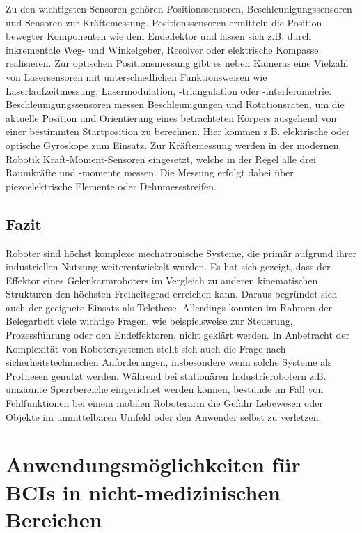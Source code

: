 \documentclass[11pt,ngerman,parskip=half]{scrartcl}
\begin{document}
Zu den wichtigsten Sensoren gehören Positionssensoren,
Beschleunigungssensoren und Sensoren zur Kräftemessung. Positionssensoren
ermitteln die Position bewegter Komponenten wie dem Endeffektor und lassen sich
z.B. durch inkrementale Weg- und Winkelgeber, Resolver oder elektrische Kompasse
realisieren. Zur optischen Positionsmessung gibt es neben Kameras eine Vielzahl 
von Lasersensoren mit unterschiedlichen Funktionsweisen wie
Laserlaufzeitmessung, Lasermodulation, -triangulation oder -interferometrie.
Beschleunigungssensoren messen Beschleunigungen und Rotationsraten, um die
aktuelle Position und Orientierung eines betrachteten Körpers ausgehend von
einer bestimmten Startposition zu berechnen. Hier kommen z.B. elektrische
oder optische Gyroskope zum Einsatz. Zur Kräftemessung werden in der modernen
Robotik Kraft-Moment-Sensoren eingesetzt, welche in der Regel alle drei
Raumkräfte und -momente messen. Die Messung erfolgt dabei über
piezoelektrische Elemente oder Dehnmessstreifen.
\parencite[vgl.][98--117]{hesse_taschenbuch_2016}

\subsection{Fazit}
\label{subsec:john_fazit}
Roboter sind höchst komplexe mechatronische Systeme, die primär aufgrund
ihrer industriellen Nutzung weiterentwickelt wurden. Es hat sich gezeigt,
dass der Effektor eines Gelenkarmroboters im Vergleich zu anderen
kinematischen Strukturen den höchsten Freiheitsgrad erreichen kann. Daraus
begründet sich auch der geeignete Einsatz als Telethese. Allerdings konnten
im Rahmen der Belegarbeit viele wichtige Fragen, wie beispielsweise zur
Steuerung, Prozessführung oder den Endeffektoren, nicht geklärt werden. In
Anbetracht der Komplexität von Robotersystemen stellt sich auch die Frage
nach sicherheitstechnischen Anforderungen, insbesondere wenn solche Systeme
als Prothesen genutzt werden. Während bei stationären Industrierobotern z.B.
umzäunte Sperrbereiche eingerichtet werden können, bestünde im Fall von
Fehlfunktionen bei einem mobilen Roboterarm die Gefahr Lebewesen oder Objekte
im unmittelbaren Umfeld oder den Anwender selbst zu verletzen.

\pagebreak
\section{Anwendungsmöglichkeiten für BCIs in nicht-medizinischen Bereichen}
\end{document}
